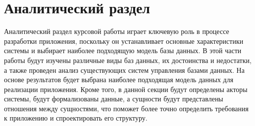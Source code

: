 \section{Аналитический раздел} \label{analysis}


Аналитический раздел курсовой работы играет ключевую роль в процессе разработки приложения, поскольку он устанавливает основные характеристики системы и выбирает наиболее подходящую модель базы данных. В этой части работы будут изучены различные виды баз данных, их достоинства и недостатки, а также проведен анализ существующих систем управления базами данных. На основе результатов будет выбрана наиболее подходящая модель данных для реализации приложения. Кроме того, в данной секции будут определены акторы системы, будут формализованы данные, а сущности будут представлены отношения между сущностями, что поможет более точно определить требования к приложению и спроектировать его структуру.

